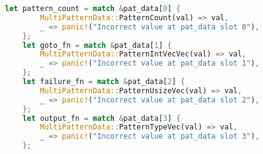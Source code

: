 \begin{lstlisting}[language=Rust,caption={Rust unpacking of pattern data},label={lst:rust_unpack},showstringspaces=false]
    let pattern_count = match &pat_data[0] {
        MultiPatternData::PatternCount(val) => val,
        _ => panic!("Incorrect value at pat_data slot 0"),
    };
    let goto_fn = match &pat_data[1] {
        MultiPatternData::PatternIntVecVec(val) => val,
        _ => panic!("Incorrect value at pat_data slot 1"),
    };
    let failure_fn = match &pat_data[2] {
        MultiPatternData::PatternUsizeVec(val) => val,
        _ => panic!("Incorrect value at pat_data slot 2"),
    };
    let output_fn = match &pat_data[3] {
        MultiPatternData::PatternTypeVec(val) => val,
        _ => panic!("Incorrect value at pat_data slot 3"),
    };
\end{lstlisting}
